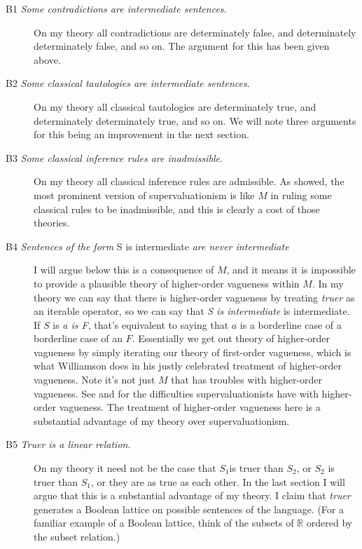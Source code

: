 \begin{description}
\item[B1 \emph{Some contradictions are intermediate sentences}.]
\hfill\break
On my theory all contradictions are determinately false, and
determinately determinately false, and so on. The argument for this has
been given above.
\item[B2 \emph{Some classical tautologies are intermediate sentences}.]
\hfill\break
On my theory all classical tautologies are determinately true, and
determinately determinately true, and so on. We will note three
arguments for this being an improvement in the next section.
\item[B3 \emph{Some classical inference rules are inadmissible}.]
\hfill\break
On my theory all classical inference rules are admissible. As
\citet{Williamson1994-WILV} showed, the most prominent version of
supervaluationism is like \(M\) in ruling some classical rules to be
inadmissible, and this is clearly a cost of those theories.
\item[B4 \emph{Sentences of the form} S is intermediate \emph{are never
intermediate}]
\hfill\break
I will argue below this is a consequence of \(M\), and it means it is
impossible to provide a plausible theory of higher-order vagueness
within \(M\). In my theory we can say that there is higher-order
vagueness by treating \emph{truer} as an iterable operator, so we can
say that \emph{S is intermediate} is intermediate. If \(S\) is \emph{a
is F}, that's equivalent to saying that \(a\) is a borderline case of a
borderline case of an \(F\). Essentially we get out theory of
higher-order vagueness by simply iterating our theory of first-order
vagueness, which is what Williamson does in his justly celebrated
treatment of higher-order vagueness. Note it's not just \(M\) that has
troubles with higher-order vagueness. See \citet{Williamson1994-WILV}
and \citet{Weatherson2003-Keefe} for the difficulties supervaluationists
have with higher-order vagueness. The treatment of higher-order
vagueness here is a substantial advantage of my theory over
supervaluationism.
\item[B5 \emph{Truer is a linear relation}.]
\hfill\break
On my theory it need not be the case that \(S_1\)is truer than \(S_2\),
or \(S_2\) is truer than \(S_1\), or they are as true as each other. In
the last section I will argue that this is a substantial advantage of my
theory. I claim that \emph{truer} generates a Boolean lattice on
possible sentences of the language. (For a familiar example of a Boolean
lattice, think of the subsets of \(\mathbb{R}\) ordered by the subset
relation.)
\end{description}

